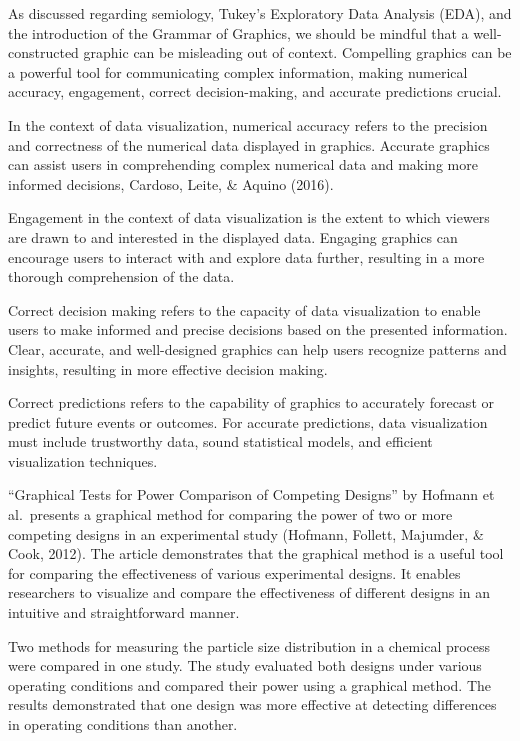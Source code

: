 \documentclass[print]{nuthesis}
\begin{document}
As discussed regarding semiology, Tukey's Exploratory Data Analysis (EDA), and the introduction of the Grammar of Graphics, we should be mindful that a well-constructed graphic can be misleading out of context.
Compelling graphics can be a powerful tool for communicating complex information, making numerical accuracy, engagement, correct decision-making, and accurate predictions crucial.

In the context of data visualization, numerical accuracy refers to the precision and correctness of the numerical data displayed in graphics.
Accurate graphics can assist users in comprehending complex numerical data and making more informed decisions, Cardoso, Leite, \& Aquino (2016).

Engagement in the context of data visualization is the extent to which viewers are drawn to and interested in the displayed data.
Engaging graphics can encourage users to interact with and explore data further, resulting in a more thorough comprehension of the data.

Correct decision making refers to the capacity of data visualization to enable users to make informed and precise decisions based on the presented information.
Clear, accurate, and well-designed graphics can help users recognize patterns and insights, resulting in more effective decision making.

Correct predictions refers to the capability of graphics to accurately forecast or predict future events or outcomes.
For accurate predictions, data visualization must include trustworthy data, sound statistical models, and efficient visualization techniques.

``Graphical Tests for Power Comparison of Competing Designs'' by Hofmann et al.~presents a graphical method for comparing the power of two or more competing designs in an experimental study (Hofmann, Follett, Majumder, \& Cook, 2012).
The article demonstrates that the graphical method is a useful tool for comparing the effectiveness of various experimental designs.
It enables researchers to visualize and compare the effectiveness of different designs in an intuitive and straightforward manner.

Two methods for measuring the particle size distribution in a chemical process were compared in one study.
The study evaluated both designs under various operating conditions and compared their power using a graphical method.
The results demonstrated that one design was more effective at detecting differences in operating conditions than another.
\end{document}

